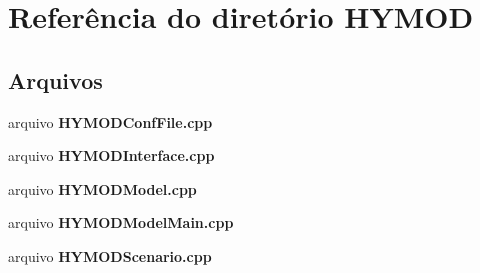 \section{Referência do diretório H\+Y\+M\+OD}
\label{dir_1632aa651906345cfa2b6f58b3cd5ff8}
\subsection*{Arquivos}
\begin{DoxyCompactItemize}
\item 
arquivo {\bf H\+Y\+M\+O\+D\+Conf\+File.\+cpp}
\item 
arquivo {\bf H\+Y\+M\+O\+D\+Interface.\+cpp}
\item 
arquivo {\bf H\+Y\+M\+O\+D\+Model.\+cpp}
\item 
arquivo {\bf H\+Y\+M\+O\+D\+Model\+Main.\+cpp}
\item 
arquivo {\bf H\+Y\+M\+O\+D\+Scenario.\+cpp}
\end{DoxyCompactItemize}
